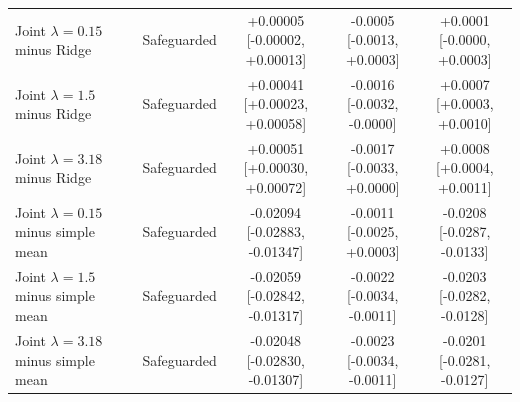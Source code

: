 \begin{tabular}{llccc}
\shortstack[l]{Joint $\lambda=0.15$\\minus Ridge} & Safeguarded & \shortstack{+0.00005\\{[-0.00002, +0.00013]}} & \shortstack{-0.0005\\{[-0.0013, +0.0003]}} & \shortstack{+0.0001\\{[-0.0000, +0.0003]}} \\
\shortstack[l]{Joint $\lambda=1.5$\\minus Ridge} & Safeguarded & \shortstack{+0.00041\\{[+0.00023, +0.00058]}} & \shortstack{-0.0016\\{[-0.0032, -0.0000]}} & \shortstack{+0.0007\\{[+0.0003, +0.0010]}} \\
\shortstack[l]{Joint $\lambda=3.18$\\minus Ridge} & Safeguarded & \shortstack{+0.00051\\{[+0.00030, +0.00072]}} & \shortstack{-0.0017\\{[-0.0033, +0.0000]}} & \shortstack{+0.0008\\{[+0.0004, +0.0011]}} \\
\shortstack[l]{Joint $\lambda=0.15$\\minus simple mean} & Safeguarded & \shortstack{-0.02094\\{[-0.02883, -0.01347]}} & \shortstack{-0.0011\\{[-0.0025, +0.0003]}} & \shortstack{-0.0208\\{[-0.0287, -0.0133]}} \\
\shortstack[l]{Joint $\lambda=1.5$\\minus simple mean} & Safeguarded & \shortstack{-0.02059\\{[-0.02842, -0.01317]}} & \shortstack{-0.0022\\{[-0.0034, -0.0011]}} & \shortstack{-0.0203\\{[-0.0282, -0.0128]}} \\
\shortstack[l]{Joint $\lambda=3.18$\\minus simple mean} & Safeguarded & \shortstack{-0.02048\\{[-0.02830, -0.01307]}} & \shortstack{-0.0023\\{[-0.0034, -0.0011]}} & \shortstack{-0.0201\\{[-0.0281, -0.0127]}} \\
\hline
\end{tabular}

